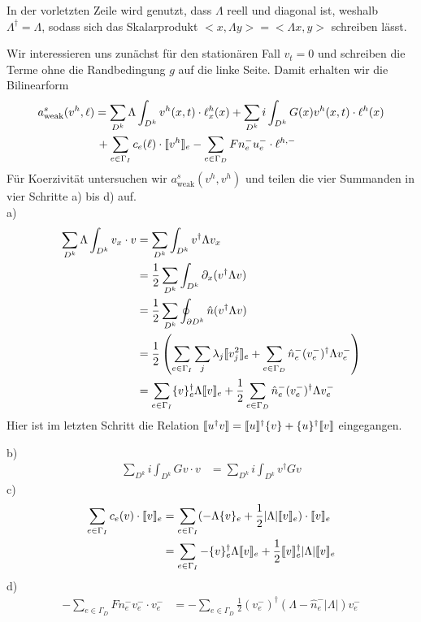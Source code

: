 In der vorletzten Zeile wird genutzt, dass $\Lambda$ reell und diagonal ist, weshalb $\Lambda^\dagger = \Lambda$, sodass sich das Skalarprodukt ${<x,\Lambda y> = <\Lambda x, y>}$ schreiben lässt.

Wir interessieren uns zunächst für den stationären Fall $v_t = 0$ und schreiben die Terme ohne die Randbedingung $g$ auf die linke Seite. Damit erhalten wir die Bilinearform
\begin{align}
  a_\text{weak}^s(v^h, \ell) &=  \sum_{D^k} \Lambda \int_{D^k} v^h(x,t) \cdot \ell^h_x(x) + \sum_{D^k} i \int_{D^k} G(x) v^h(x,t) \cdot \ell^h(x) \\
  & \, + \sum_{e\in\Gamma_I}  c_e(\ell) \cdot \llbracket v^h \rrbracket_e - \sum_{e\in\Gamma_D}  F n_e^- u_e^- \cdot \ell^{h,-}
\end{align}
Für Koerzivität untersuchen wir $a_\text{weak}^s(v^h, v^h)$ und teilen die vier Summanden in vier Schritte a) bis d) auf.\\
a)
\begin{align*}
  \sum_{D^k} \Lambda \int_{D^k} v_x \cdot v &=  \sum_{D^k}\int_{D^k} v^{\dagger} \Lambda v_x \\
  &=  \frac{1}{2}  \sum_{D^k}\int_{D^k} \partial_x (v^{\dagger} \Lambda v) \\
  &=  \frac{1}{2}  \sum_{D^k}\oint_{\partial D^k} \hat{n} (v^{\dagger} \Lambda v) \\
  &=  \frac{1}{2}  \left( \sum_{e\in\Gamma_I} \sum_j \lambda_j \llbracket v_j^2 \rrbracket_e
     + \sum_{e\in\Gamma_D} \hat{n}_e^-  (v^-_e)^{\dagger}\Lambda v^-_e \right) \\
  &=   \sum_{e\in\Gamma_I} \{ v \}_e^{\dagger}\Lambda\llbracket v \rrbracket_e
     + \frac{1}{2}   \sum_{e\in\Gamma_D} \hat{n}_e^-  (v^-_e)^{\dagger}\Lambda v^-_e
\end{align*}
Hier ist im letzten Schritt die Relation $\llbracket u^{\dagger}v \rrbracket = \llbracket u \rrbracket^{\dagger}\{ v \} + \{ u \}^{\dagger}\llbracket v \rrbracket$ eingegangen.

b)
\begin{align*}
  \sum_{D^k} i \int_{D^k} G v \cdot v &= \sum_{D^k} i \int_{D^k} v^{\dagger} G v
\end{align*}
c)
\begin{align*}
  \sum_{e\in\Gamma_I}  c_e(v) \cdot \llbracket v \rrbracket_e &= \sum_{e\in\Gamma_I} (-\Lambda  \{ v \}_e  + \frac{1}{2}|\Lambda| \llbracket v \rrbracket_e) \cdot \llbracket v \rrbracket_e \\
  &= \sum_{e\in\Gamma_I} -\{ v \}_e^{\dagger} \Lambda \llbracket v \rrbracket_e + \frac{1}{2}\llbracket v \rrbracket_e^{\dagger} |\Lambda|\llbracket v \rrbracket_e
\end{align*}
d)
\begin{align*}
  - \sum_{e\in\Gamma_D}  F n_e^- v_e^- \cdot v_e^- &= - \sum_{e\in\Gamma_D} \frac{1}{2}(v_e^-)^{\dagger}(\Lambda - \hat{n}_e^- |\Lambda|)v_e^-
\end{align*}

